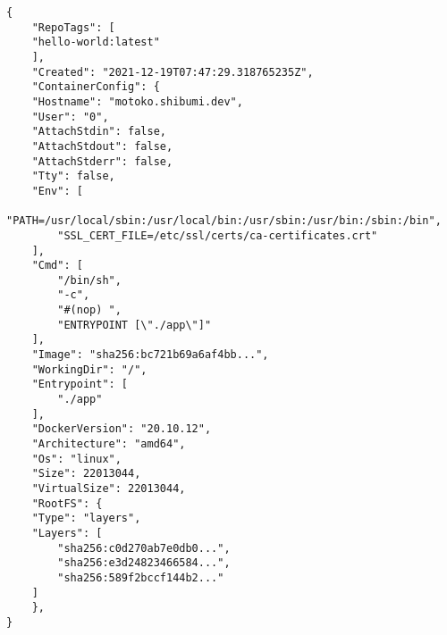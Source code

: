 \documentclass[titlepage]{report}
\begin{document}
\begin{minipage}{\linewidth}
\begin{lstlisting}[caption={An OCI image configuration created via docker image inspect (shortened)},label={lst:imageConfiguration}]
{
    "RepoTags": [
    "hello-world:latest"
    ],
    "Created": "2021-12-19T07:47:29.318765235Z",
    "ContainerConfig": {
    "Hostname": "motoko.shibumi.dev",
    "User": "0",
    "AttachStdin": false,
    "AttachStdout": false,
    "AttachStderr": false,
    "Tty": false,
    "Env": [
        "PATH=/usr/local/sbin:/usr/local/bin:/usr/sbin:/usr/bin:/sbin:/bin",
        "SSL_CERT_FILE=/etc/ssl/certs/ca-certificates.crt"
    ],
    "Cmd": [
        "/bin/sh",
        "-c",
        "#(nop) ",
        "ENTRYPOINT [\"./app\"]"
    ],
    "Image": "sha256:bc721b69a6af4bb...",
    "WorkingDir": "/",
    "Entrypoint": [
        "./app"
    ],
    "DockerVersion": "20.10.12",
    "Architecture": "amd64",
    "Os": "linux",
    "Size": 22013044,
    "VirtualSize": 22013044,
    "RootFS": {
    "Type": "layers",
    "Layers": [
        "sha256:c0d270ab7e0db0...",
        "sha256:e3d24823466584...",
        "sha256:589f2bccf144b2..."
    ]
    },
}
\end{lstlisting}
\end{minipage}
\end{document}
